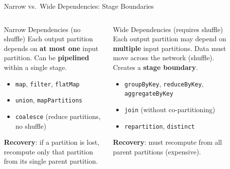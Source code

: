 \documentclass[aspectratio=169,10pt]{beamer}
\begin{document}
\begin{frame}{Narrow vs.\ Wide Dependencies: Stage Boundaries}
  \begin{columns}[T]
      \begin{block}{Narrow Dependencies (no shuffle)}
        Each output partition depends on \textbf{at most one} input partition.  Can be \textbf{pipelined} within a single stage.
        \vspace{4pt}
        \begin{itemize}
          \item \texttt{map}, \texttt{filter}, \texttt{flatMap}
          \item \texttt{union}, \texttt{mapPartitions}
          \item \texttt{coalesce} (reduce partitions, no shuffle)
        \end{itemize}
        \vspace{4pt}
        \textbf{Recovery}: if a partition is lost, recompute only that partition from its single parent partition.
      \end{block}
      \vspace{4pt}
      \begin{alertblock}{Wide Dependencies (requires shuffle)}
        Each output partition may depend on \textbf{multiple} input partitions.  Data must move across the network (shuffle).  Creates a \textbf{stage boundary}.
        \begin{itemize}
          \item \texttt{groupByKey}, \texttt{reduceByKey}, \texttt{aggregateByKey}
          \item \texttt{join} (without co-partitioning)
          \item \texttt{repartition}, \texttt{distinct}
        \end{itemize}
        \textbf{Recovery}: must recompute from all parent partitions (expensive).
      \end{alertblock}

      \begin{center}
\end{center}
\end{columns}
\end{frame}
\end{document}
